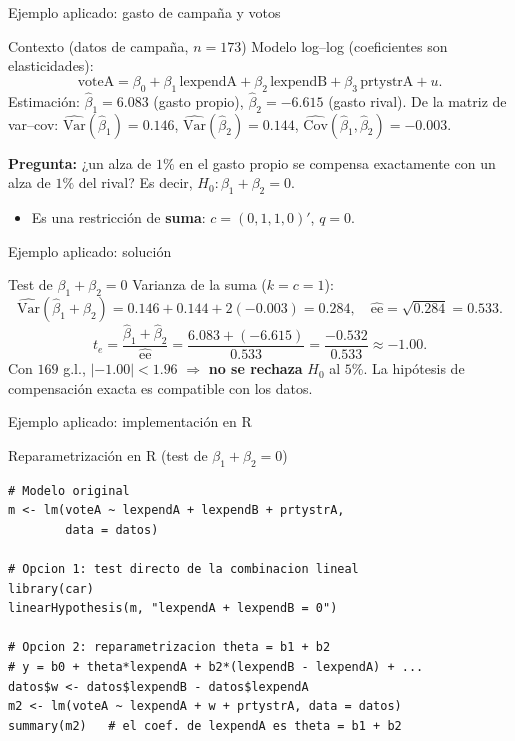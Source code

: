 \documentclass{beamer}
\begin{document}
\begin{frame}{Ejemplo aplicado: gasto de campaña y votos}
\begin{block}{Contexto (datos de campaña, $n=173$)}
Modelo log--log (coeficientes son elasticidades):
\[
\text{voteA}=\beta_0+\beta_1\,\text{lexpendA}+\beta_2\,\text{lexpendB}+\beta_3\,\text{prtystrA}+u.
\]
Estimación: $\hat{\beta}_1=6{.}083$ (gasto propio), $\hat{\beta}_2=-6{.}615$ (gasto rival). De la matriz de var--cov: $\hat{\text{Var}}(\hat{\beta}_1)=0{.}146$, $\hat{\text{Var}}(\hat{\beta}_2)=0{.}144$, $\hat{\text{Cov}}(\hat{\beta}_1,\hat{\beta}_2)=-0{.}003$.

\textbf{Pregunta:} ¿un alza de $1\%$ en el gasto propio se compensa exactamente con un alza de $1\%$ del rival? Es decir, $H_0:\beta_1+\beta_2=0$.
\end{block}
\pause
\begin{itemize}
    \item Es una restricción de \textbf{suma}: $c=(0,1,1,0)'$, $q=0$.
\end{itemize}
\end{frame}

\begin{frame}{Ejemplo aplicado: solución}
\begin{exampleblock}{Test de $\beta_1+\beta_2=0$}
Varianza de la suma ($k=c=1$):
\[
\hat{\text{Var}}(\hat{\beta}_1+\hat{\beta}_2)=0{.}146+0{.}144+2(-0{.}003)=0{.}284,\quad \widehat{\text{ee}}=\sqrt{0{.}284}=0{.}533.
\]
\[
t_e=\frac{\hat{\beta}_1+\hat{\beta}_2}{\widehat{\text{ee}}}=\frac{6{.}083+(-6{.}615)}{0{.}533}=\frac{-0{.}532}{0{.}533}\approx -1{.}00.
\]
Con $169$ g.l., $|{-1{.}00}|<1{.}96$ $\Rightarrow$ \textbf{no se rechaza} $H_0$ al $5\%$. La hipótesis de compensación exacta es compatible con los datos.
\end{exampleblock}
\end{frame}

\begin{frame}[fragile]{Ejemplo aplicado: implementación en R}
\begin{exampleblock}{Reparametrización en R (test de $\beta_1+\beta_2=0$)}
\begin{verbatim}
# Modelo original
m <- lm(voteA ~ lexpendA + lexpendB + prtystrA,
        data = datos)

# Opcion 1: test directo de la combinacion lineal
library(car)
linearHypothesis(m, "lexpendA + lexpendB = 0")

# Opcion 2: reparametrizacion theta = b1 + b2
# y = b0 + theta*lexpendA + b2*(lexpendB - lexpendA) + ...
datos$w <- datos$lexpendB - datos$lexpendA
m2 <- lm(voteA ~ lexpendA + w + prtystrA, data = datos)
summary(m2)   # el coef. de lexpendA es theta = b1 + b2
\end{verbatim}
\end{exampleblock}
\end{frame}
\end{document}
